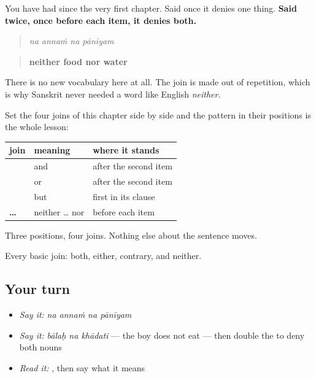 \begin{grammarlens}[title={Grammar Lens: the fourth join needs no new word}]
You have had \textbf{} since the very first chapter. Said once it denies one thing. \textbf{Said twice, once before each item, it denies both.}

\begin{quote}
\textbf{   }
\end{quote}

\begin{quote}
\emph{na annaṁ na pānīyam}
\end{quote}

\begin{quote}
\textbf{neither food nor water}
\end{quote}

There is no new vocabulary here at all. The join is made out of repetition, which is why Sanskrit never needed a word like English \emph{neither}.

Set the four joins of this chapter side by side and the pattern in their positions is the whole lesson:

\noindent
\begin{tabularx}{\linewidth}{@{}>{\raggedright\arraybackslash}X>{\raggedright\arraybackslash}X>{\raggedright\arraybackslash}X@{}}
\toprule
\textbf{join} & \textbf{meaning} & \textbf{where it stands} \\
\midrule
\textbf{\sk{च}} & and & after the second item \\
\textbf{\sk{वा}} & or & after the second item \\
\textbf{\sk{किन्तु}} & but & first in its clause \\
\textbf{\sk{न} … \sk{न}} & neither … nor & before each item \\
\bottomrule
\end{tabularx}

Three positions, four joins. Nothing else about the sentence moves.
\end{grammarlens}

\begin{grammarlens}[title={What you've built}]
Every basic join: both, either, contrary, and neither.
\end{grammarlens}

\subsection*{Your turn}
\begin{itemize}
\raggedright
  \item \emph{Say it:} \emph{na annaṁ na pānīyam}
  \item \emph{Say it:} \emph{bālaḥ na khādati} — the boy does not eat — then double the \textbf{} to deny both nouns
  \item \emph{Read it:} \textbf{   }, then say what it means
\end{itemize}

